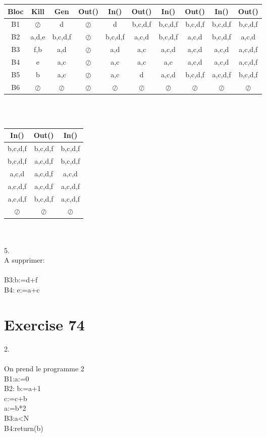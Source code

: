 \documentclass[10pt,a4paper]{article}
\begin{document}
\begin{tabular}{|c|c|c|c|c|c|c|c|c|c|}
\hline 
Bloc & Kill & Gen & Out() & In() & Out() & In() & Out() & In() & Out()  \\ 
\hline 
B1 & $\oslash$ & d & $\oslash$ & d & b,c,d,f & b,c,d,f & b,c,d,f & b,c,d,f & b,c,d,f  \\ 
\hline 
B2 & a,d,e & b,c,d,f & $\oslash$ & b,c,d,f & a,c,d & b,c,d,f & a,c,d & b,c,d,f & a,c,d \\ 
\hline 
B3 & f,b & a,d & $\oslash$ & a,d & a,c & a,c,d & a,c,d & a,c,d & a,c,d,f \\ 
\hline 
B4 & e & a,c & $\oslash$ & a,c & a,c & a,c & a,c,d & a,c,d & a,c,d,f \\ 
\hline 
B5 & b & a,c & $\oslash$ & a,c & d & a,c,d & b,c,d,f & a,c,d,f & b,c,d,f  \\ 
\hline 
B6 & $\oslash$ & $\oslash$ & $\oslash$ & $\oslash$ & $\oslash$ & $\oslash$ & $\oslash$ & $\oslash$ & $\oslash$ \\ 
\hline 
\end{tabular} 
\\
\\

\begin{tabular}{|c|c|c|}
\hline
In() & Out() & In()\\
\hline 
b,c,d,f & b,c,d,f & b,c,d,f\\
\hline 
b,c,d,f & a,c,d,f & b,c,d,f\\
\hline 
a,c,d & a,c,d,f & a,c,d\\
\hline 
 a,c,d,f & a,c,d,f & a,c,d,f \\
\hline 
a,c,d,f & b,c,d,f & a,c,d,f\\
\hline 
 $\oslash$ & $\oslash$ & $\oslash$\\
\hline 
\end{tabular} 
\\
\\

{\large 5.}\\
A supprimer:\\\\
B3:b:=d+f\\
B4: e:=a+c\\

\section{Exercise 74}

2.\\\\
On prend le programme 2\\
B1:a:=0\\
B2: b:=a+1\\
c:=c+b\\
a:=b*2\\
B3:a<N\\
B4:return(b)\\
\end{document}
